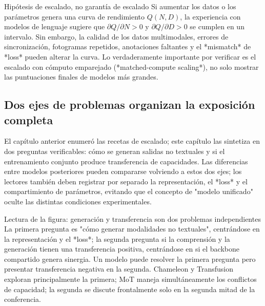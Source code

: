 \begin{importantbox}{Hipótesis de escalado, no garantía de escalado}
Si aumentar los datos o los parámetros genera una curva de rendimiento $Q(N,D)$, la experiencia con modelos de lenguaje sugiere que $\partial Q/\partial N>0$ y $\partial Q/\partial D>0$ se cumplen en un intervalo. Sin embargo, la calidad de los datos multimodales, errores de sincronización, fotogramas repetidos, anotaciones faltantes y el *mismatch* de *loss* pueden alterar la curva. Lo verdaderamente importante por verificar es el escalado con cómputo emparejado (*matched-compute scaling*), no solo mostrar las puntuaciones finales de modelos más grandes.
\end{importantbox}


\subsection{Dos ejes de problemas organizan la exposición completa}

El capítulo anterior enumeró las recetas de escalado; este capítulo las sintetiza en dos preguntas verificables: cómo se generan salidas no textuales y si el entrenamiento conjunto produce transferencia de capacidades. Las diferencias entre modelos posteriores pueden compararse volviendo a estos dos ejes; los lectores también deben registrar por separado la representación, el *loss* y el compartimiento de parámetros, evitando que el concepto de "modelo unificado" oculte las distintas condiciones experimentales.


\begin{knowledgebox}{Lectura de la figura: generación y transferencia son dos problemas independientes}
La primera pregunta es "cómo generar modalidades no textuales", centrándose en la representación y el *loss*; la segunda pregunta si la comprensión y la generación tienen una transferencia positiva, centrándose en si el backbone compartido genera sinergia. Un modelo puede resolver la primera pregunta pero presentar transferencia negativa en la segunda. Chameleon y Transfusion exploran principalmente la primera; MoT maneja simultáneamente los conflictos de capacidad; la segunda se discute frontalmente solo en la segunda mitad de la conferencia.
\end{knowledgebox}

